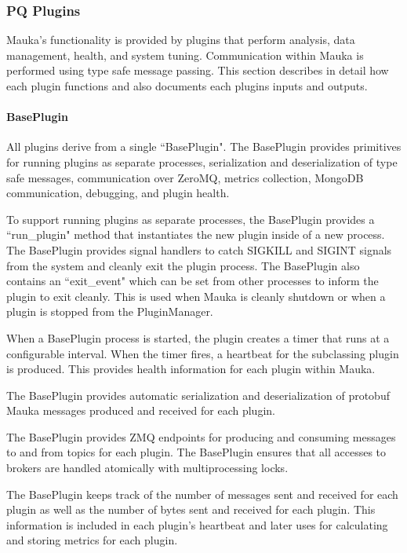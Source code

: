 \subsubsection{PQ Plugins}
Mauka's functionality is provided by plugins that perform analysis, data management, health, and system tuning. Communication within Mauka is performed using type safe message passing. This section describes in detail how each plugin functions and also documents each plugins inputs and outputs.

\paragraph{BasePlugin}
All plugins derive from a single ``BasePlugin". The BasePlugin provides primitives for running plugins as separate processes, serialization and deserialization of type safe messages, communication over ZeroMQ, metrics collection, MongoDB communication, debugging, and plugin health.

To support running plugins as separate processes, the BasePlugin provides a ``run\_plugin" method that instantiates the new plugin inside of a new process. The BasePlugin provides signal handlers to catch SIGKILL and SIGINT signals from the system and cleanly exit the plugin process. The BasePlugin also contains an ``exit\_event" which can be set from other processes to inform the plugin to exit cleanly. This is used when Mauka is cleanly shutdown or when a plugin is stopped from the PluginManager.

When a BasePlugin process is started, the plugin creates a timer that runs at a configurable interval. When the timer fires, a heartbeat for the subclassing plugin is produced. This provides health information for each plugin within Mauka.

The BasePlugin provides automatic serialization and deserialization of protobuf Mauka messages produced and received for each plugin.

The BasePlugin provides ZMQ endpoints for producing and consuming messages to and from topics for each plugin. The BasePlugin ensures that all accesses to brokers are handled atomically with multiprocessing locks.

The BasePlugin keeps track of the number of messages sent and received for each plugin as well as the number of bytes sent and received for each plugin. This information is included in each plugin's heartbeat and later uses for calculating and storing metrics for each plugin.

